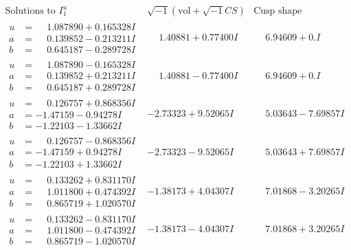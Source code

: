 \documentclass[1p]{elsarticle_modified}
\theoremstyle{definition}
\newcommand{\I}{\sqrt{-1}}
\begin{document}
$$\begin{array}{c|c|c}  
\text{Solutions to }I^u_{1}& \I (\text{vol} + \sqrt{-1}CS) & \text{Cusp shape}\\
 \hline 
\begin{aligned}
u &= \phantom{-}1.087890 + 0.165328 I \\
a &= \phantom{-}0.139852 - 0.213211 I \\
b &= \phantom{-}0.645187 - 0.289728 I\end{aligned}
 & \phantom{-}1.40881 + 0.77400 I & \phantom{-}6.94609 + 0. I\phantom{ +0.000000I} \\ \hline\begin{aligned}
u &= \phantom{-}1.087890 - 0.165328 I \\
a &= \phantom{-}0.139852 + 0.213211 I \\
b &= \phantom{-}0.645187 + 0.289728 I\end{aligned}
 & \phantom{-}1.40881 - 0.77400 I & \phantom{-}6.94609 + 0. I\phantom{ +0.000000I} \\ \hline\begin{aligned}
u &= \phantom{-}0.126757 + 0.868356 I \\
a &= -1.47159 - 0.94278 I \\
b &= -1.22103 - 1.33662 I\end{aligned}
 & -2.73323 + 9.52065 I & \phantom{-}5.03643 - 7.69857 I \\ \hline\begin{aligned}
u &= \phantom{-}0.126757 - 0.868356 I \\
a &= -1.47159 + 0.94278 I \\
b &= -1.22103 + 1.33662 I\end{aligned}
 & -2.73323 - 9.52065 I & \phantom{-}5.03643 + 7.69857 I \\ \hline\begin{aligned}
u &= \phantom{-}0.133262 + 0.831170 I \\
a &= \phantom{-}1.011800 + 0.474392 I \\
b &= \phantom{-}0.865719 + 1.020570 I\end{aligned}
 & -1.38173 + 4.04307 I & \phantom{-}7.01868 - 3.20265 I \\ \hline\begin{aligned}
u &= \phantom{-}0.133262 - 0.831170 I \\
a &= \phantom{-}1.011800 - 0.474392 I \\
b &= \phantom{-}0.865719 - 1.020570 I\end{aligned}
 & -1.38173 - 4.04307 I & \phantom{-}7.01868 + 3.20265 I \\ \hline\begin{aligned}

\end{aligned}
\end{array}$$
\end{document}
